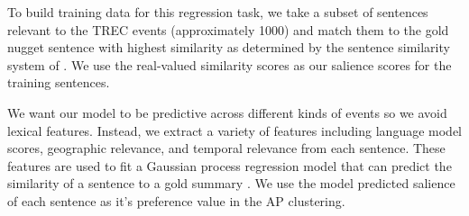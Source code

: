 \documentclass{sig-alternate} \usepackage{url} \usepackage{color}
\begin{document}
To build training data for this regression task, we take a subset of sentences
relevant to the TREC events (approximately 1000) and match them to the gold
nugget sentence with highest similarity as determined by the sentence
similarity system of \cite{guo2012simple}. 
We use the real-valued similarity scores as our salience scores for the
training sentences.

We want our model to be predictive across different kinds of events so we
avoid lexical features.  Instead, we extract a variety of features including
language model scores, geographic relevance, and temporal relevance from each
sentence.  These features are used to fit a Gaussian process regression model
that can predict the similarity of a sentence to a gold summary
\cite{preotiuc2013temporal}.  We use the model predicted salience of each
sentence as it's preference value in the AP clustering. 







\end{document}
